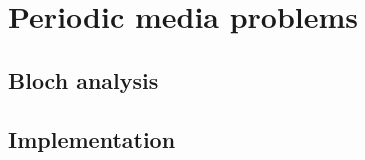 %
\cleardoublepage {}
\chapter{Periodic media problems}
\section{Bloch analysis}
\section{Implementation}





